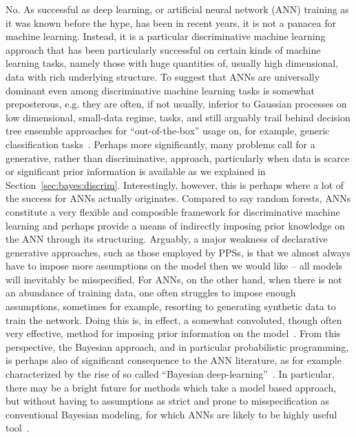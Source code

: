 No.  As successful as deep learning, or artificial neural network (ANN) training as it was known before the hype,
has been in recent years, it is not a panacea for machine learning.  Instead, it is a particular discriminative
machine learning approach that has been particularly successful on certain kinds of machine learning tasks,
namely those with huge quantities of, usually high dimensional, data with rich underlying structure.   
To suggest that ANNs are universally dominant even among discriminative machine learning tasks is
somewhat preposterous, e.g. they are often, if not usually, inferior to Gaussian processes on low dimensional,
small-data regime, tasks, and still arguably trail behind decision tree ensemble approaches for ``out-of-the-box''
usage on, for example, generic classification tasks~\citep{rainforth2015canonical}.   Perhaps more significantly,
many problems call for a generative, rather than discriminative, approach,
particularly when data is scarce or significant prior information is available as we explained
in Section~\ref{sec:bayes:discrim}.  Interestingly, however, this is perhaps
where a lot of the success for ANNs actually originates.  Compared to say random forests, ANNs constitute a very
flexible and composible framework for discriminative machine learning and perhaps provide a means of 
indirectly imposing prior knowledge on the ANN through its structuring.  Arguably, a major weakness of
declarative generative approaches, such as those employed by PPSs, is that we almost
always have to impose more assumptions on the model then we would like -- all models will inevitably be
misspecified.  For ANNs, on the other hand, when there is not an abundance of training data,
 one often struggles to impose enough assumptions, sometimes
for example, resorting to generating synthetic data to train the network.  Doing this is, in effect, a somewhat convoluted,
though often very effective, method for imposing prior information on the model~\citep{le2017using}.  From this
perspective, the Bayesian approach, and in particular probabilistic programming, is perhaps also of significant
consequence to the ANN literature, as for example characterized  by the rise of so called 
``Bayesian deep-learning''~\citep{gal2016uncertainty}.
  In particular, there may be a bright future for methods which
take a model based approach, but without having to assumptions as strict and prone to misspecification
as conventional Bayesian modeling, for which ANNs are likely to be highly useful tool~\citep{siddharth2017learning}.

